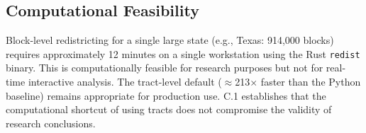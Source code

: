 \subsection{Computational Feasibility}

Block-level redistricting for a single large state (e.g., Texas:
914,000 blocks) requires approximately 12 minutes on a single workstation
using the Rust \texttt{redist} binary. This is computationally feasible
for research purposes but not for real-time interactive analysis.
The tract-level default ($\approx$213$\times$ faster than the Python
baseline) remains appropriate for production use. C.1 establishes that
the computational shortcut of using tracts does not compromise the
validity of research conclusions.
